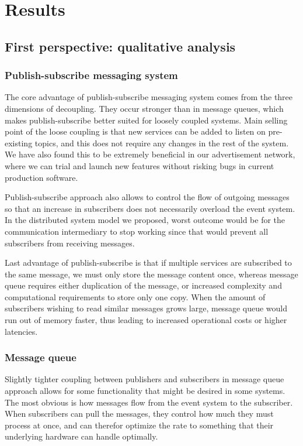 \documentclass[conference]{IEEEtran}
\begin{document}
\section{Results}
\subsection{First perspective: qualitative analysis}
\subsubsection{Publish-subscribe messaging system}
The core advantage of publish-subscribe messaging system comes from the three dimensions of decoupling. They occur stronger than in message queues, which makes publish-subscribe better suited for loosely coupled systems. Main selling point of the loose coupling is that new services can be added to listen on pre-existing topics, and this does not require any changes in the rest of the system. We have also found this to be extremely beneficial in our advertisement network, where we can trial and launch new features without risking bugs in current production software. 

Publish-subscribe approach also allows to control the flow of outgoing messages so that an increase in subscribers does not necessarily overload the event system. In the distributed system model we proposed, worst outcome would be for the communication intermediary to stop working since that would prevent all subscribers from receiving messages.

Last advantage of publish-subscribe is that if multiple services are subscribed to the same message, we must only store the message content once, whereas message queue requires either duplication of the message, or increased complexity and computational requirements to store only one copy. When the amount of subscribers wishing to read similar messages grows large, message queue would run out of memory faster, thus leading to increased operational costs or higher latencies.

\subsubsection{Message queue}
Slightly tighter coupling between publishers and subscribers in message queue approach allows for some functionality that might be desired in some systems. The most obvious is how messages flow from the event system to the subscriber. When subscribers can pull the messages, they control how much they must process at once, and can therefor optimize the rate to something that their underlying hardware can handle optimally.
\end{document}
